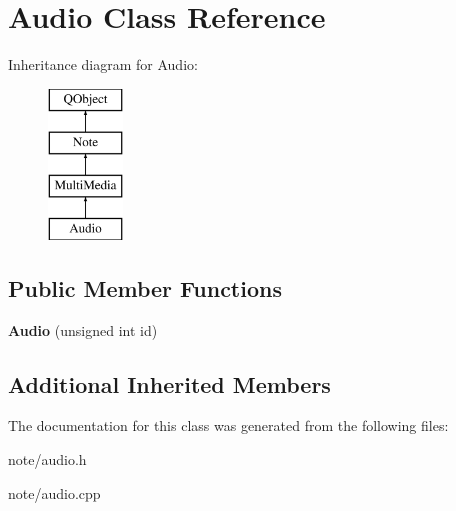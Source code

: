 \hypertarget{class_audio}{\section{Audio Class Reference}
\label{class_audio}
}
Inheritance diagram for Audio\-:\begin{figure}[H]
\begin{center}
\leavevmode
\includegraphics[height=4.000000cm]{class_audio}
\end{center}
\end{figure}
\subsection*{Public Member Functions}
\begin{DoxyCompactItemize}
\item 
\hypertarget{class_audio_a0726a864123bda657552f4deb30bc90d}{{\bfseries Audio} (unsigned int id)}\label{class_audio_a0726a864123bda657552f4deb30bc90d}

\end{DoxyCompactItemize}
\subsection*{Additional Inherited Members}


The documentation for this class was generated from the following files\-:\begin{DoxyCompactItemize}
\item 
note/audio.\-h\item 
note/audio.\-cpp\end{DoxyCompactItemize}
